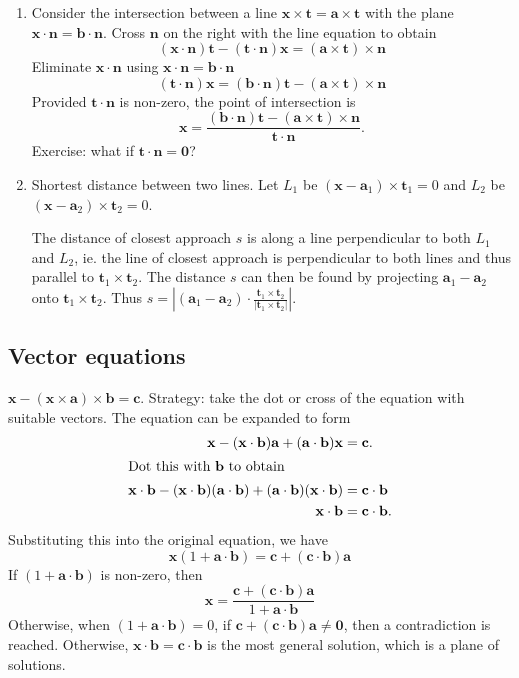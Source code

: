 \documentclass[a4paper]{article}
\begin{document}
\begin{eg}\leavevmode
  \begin{enumerate}
    \item Consider the intersection between a line $\mathbf{x\times t = a\times t}$ with the plane $\mathbf{x\cdot n = b\cdot n}$. Cross $\mathbf{n}$ on the right with the line equation to obtain
      \[
        \mathbf{(x\cdot n)t - (t\cdot n)x = (a\times t)\times n}
      \]
      Eliminate $\mathbf{x\cdot n}$ using $\mathbf{x\cdot n = b\cdot n}$
      \[
        \mathbf{(t\cdot n)x = (b\cdot n)t - (a\times t)\times n}
      \]
      Provided $\mathbf{t\cdot n}$ is non-zero, the point of intersection is
      \[
        \mathbf{x = \frac{(b\cdot n)t - (a\times t)\times n}{t\cdot n}}.
      \]
      Exercise: what if $\mathbf{t\cdot n = 0}$?
    \item Shortest distance between two lines. Let $L_1$ be $(\mathbf{x} - \mathbf{a}_1)\times \mathbf{t}_1 = 0$ and $L_2$ be $(\mathbf{x} - \mathbf{a}_2)\times \mathbf{t}_2 = 0$.

      The distance of closest approach $s$ is along a line perpendicular to both $L_1$ and $L_2$, ie. the line of closest approach is perpendicular to both lines and thus parallel to $\mathbf{t}_1\times \mathbf{t}_2$. The distance $s$ can then be found by projecting $\mathbf{a}_1 - \mathbf{a}_2$ onto $\mathbf{t}_1\times \mathbf{t}_2$. Thus $s = \left|(\mathbf{a}_1 - \mathbf{a}_2)\cdot\frac{\mathbf{t}_1\times \mathbf{t}_2}{|\mathbf{t}_1\times \mathbf{t}_2|}\right|$.
  \end{enumerate}
\end{eg}
\subsection{Vector equations}
\begin{eg}
  $\mathbf{x - (x\times a)\times b = c}$. Strategy: take the dot or cross of the equation with suitable vectors. The equation can be expanded to form
  \begin{align*}
    \mathbf{x - (x\cdot b)a + (a\cdot b)x} &= \mathbf{c}.\\
    \intertext{Dot this with $\mathbf{b}$ to obtain}
    \mathbf{x\cdot b - (x\cdot b)(a\cdot b) + (a\cdot b)(x\cdot b)} &= \mathbf{c\cdot b}\\
    \mathbf{x\cdot b} &= \mathbf{c\cdot b}.
  \end{align*}
  Substituting this into the original equation, we have
  \[
    \mathbf{x}(1 + \mathbf{a\cdot b}) = \mathbf{c + (c\cdot b)a}
  \]
  If $(1 + \mathbf{a \cdot b})$ is non-zero, then
  \[
    \mathbf{x} = \frac{\mathbf{c + (c\cdot b)a}}{1 + \mathbf{a\cdot b}}
  \]
  Otherwise, when $(1 + \mathbf{a\cdot b}) = 0$, if $\mathbf{c + (c\cdot b)a \not= 0}$, then a contradiction is reached. Otherwise, $\mathbf{x\cdot b = c\cdot b}$ is the most general solution, which is a plane of solutions.
\end{eg}
\end{document}
